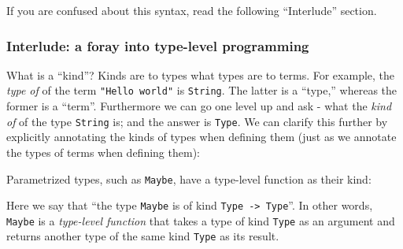 If you are confused about this syntax, read the following ``Interlude''
section.

\hypertarget{interlude-a-foray-into-type-level-programming}{%
\subsubsection{Interlude: a foray into type-level
programming}\label{interlude-a-foray-into-type-level-programming}}

What is a ``kind''? Kinds are to types what types are to terms. For
example, the \emph{type of} of the term \texttt{"Hello\ world"} is
\texttt{String}. The latter is a ``type,'' whereas the former is a
``term''. Furthermore we can go one level up and ask - what the
\emph{kind of} of the type \texttt{String} is; and the answer is
\texttt{Type}. We can clarify this further by explicitly annotating the
kinds of types when defining them (just as we annotate the types of
terms when defining them):

\begin{Shaded}
\begin{Highlighting}[]
 
\OtherTok{=}  

 \OtherTok{ ::} 
  \OtherTok{=}  \OperatorTok{|} 
\end{Highlighting}
\end{Shaded}

Parametrized types, such as \texttt{Maybe}, have a type-level function
as their kind:

\begin{Shaded}
\begin{Highlighting}[]
 \OtherTok{ ::}  \OtherTok{{-}\textgreater{}}  
 \OtherTok{=}  \OperatorTok{|} 
\end{Highlighting}
\end{Shaded}

Here we say that ``the type \texttt{Maybe} is of kind
\texttt{Type\ -\textgreater{}\ Type}''. In other words, \texttt{Maybe}
is a \emph{type-level function} that takes a type of kind \texttt{Type}
as an argument and returns another type of the same kind \texttt{Type}
as its result.

